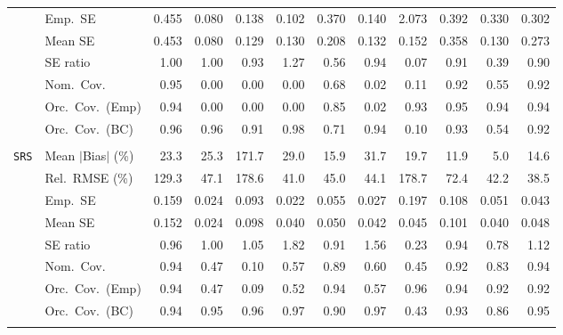 \begin{landscape}
\begin{longtable}{llrrrrrrrrrr}
 & Emp.\ SE & 0.455 & 0.080 & 0.138 & 0.102 & 0.370 & 0.140 & 2.073 & 0.392 & 0.330 & 0.302 \\
 & Mean SE & 0.453 & 0.080 & 0.129 & 0.130 & 0.208 & 0.132 & 0.152 & 0.358 & 0.130 & 0.273 \\
 & SE ratio & \cellcolor{ranktwo}1.00 & \cellcolor{rankone}1.00 & 0.93 & 1.27 & 0.56 & \cellcolor{rankthree}0.94 & 0.07 & 0.91 & 0.39 & 0.90 \\
 & Nom.\ Cov. & \cellcolor{rankone}0.95 & 0.00 & 0.00 & 0.00 & 0.68 & 0.02 & 0.11 & \cellcolor{ranktwo}0.92 & 0.55 & \cellcolor{rankthree}0.92 \\
 & Orc.\ Cov.\ (Emp) & \cellcolor{ranktwo}0.94 & 0.00 & 0.00 & 0.00 & 0.85 & 0.02 & 0.93 & \cellcolor{rankone}0.95 & \cellcolor{rankthree}0.94 & 0.94 \\
 & Orc.\ Cov.\ (BC) & \cellcolor{rankthree}0.96 & \cellcolor{rankone}0.96 & 0.91 & 0.98 & 0.71 & \cellcolor{ranktwo}0.94 & 0.10 & 0.93 & 0.54 & 0.92 \\
\addlinespace[2pt]
\multicolumn{12}{l}{\textbf{Continuous Phase-One Covariates}} \\
\addlinespace[2pt]
\quad \texttt{SRS} & Mean $|$Bias$|$ (\%) & 23.3 & 25.3 & 171.7 & 29.0 & 15.9 & 31.7 & 19.7 & \cellcolor{ranktwo}11.9 & \cellcolor{rankone}5.0 & \cellcolor{rankthree}14.6 \\
 & Rel.\ RMSE (\%) & 129.3 & 47.1 & 178.6 & \cellcolor{ranktwo}41.0 & 45.0 & 44.1 & 178.7 & 72.4 & \cellcolor{rankthree}42.2 & \cellcolor{rankone}38.5 \\
 & Emp.\ SE & 0.159 & 0.024 & 0.093 & 0.022 & 0.055 & 0.027 & 0.197 & 0.108 & 0.051 & 0.043 \\
 & Mean SE & 0.152 & 0.024 & 0.098 & 0.040 & 0.050 & 0.042 & 0.045 & 0.101 & 0.040 & 0.048 \\
 & SE ratio & \cellcolor{ranktwo}0.96 & \cellcolor{rankone}1.00 & \cellcolor{rankthree}1.05 & 1.82 & 0.91 & 1.56 & 0.23 & 0.94 & 0.78 & 1.12 \\
 & Nom.\ Cov. & \cellcolor{rankone}0.94 & 0.47 & 0.10 & 0.57 & 0.89 & 0.60 & 0.45 & \cellcolor{rankthree}0.92 & 0.83 & \cellcolor{ranktwo}0.94 \\
 & Orc.\ Cov.\ (Emp) & \cellcolor{rankone}0.94 & 0.47 & 0.09 & 0.52 & \cellcolor{rankthree}0.94 & 0.57 & \cellcolor{ranktwo}0.96 & 0.94 & 0.92 & 0.92 \\
 & Orc.\ Cov.\ (BC) & \cellcolor{rankthree}0.94 & \cellcolor{ranktwo}0.95 & 0.96 & 0.97 & 0.90 & 0.97 & 0.43 & 0.93 & 0.86 & \cellcolor{rankone}0.95 \\
\addlinespace[2pt]

\end{longtable}
\end{landscape}

